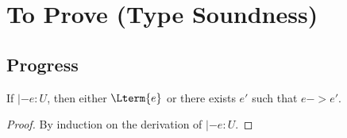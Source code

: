 \section{To Prove (Type Soundness)}

\subsection{Progress}

%

\begin{theorem}
  If $|- e : U$, then either $\Lterm{e}$ or there exists $e'$ such that $e ->
  e'$.
  \begin{proof}
    By induction on the derivation of $|- e : U$.
  \end{proof}
\end{theorem}

